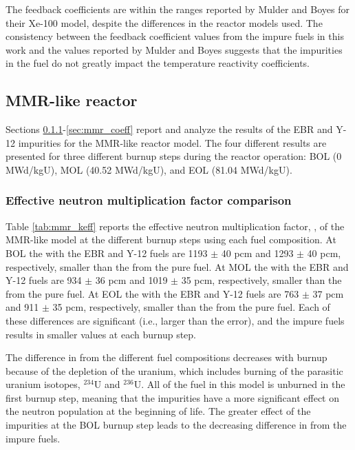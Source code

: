 The feedback coefficients are within the ranges reported 
by Mulder and Boyes \cite{mulder_neutronics_2020} for their 
Xe-100 model, despite the differences 
in the reactor models used.
The consistency between the feedback coefficient values from the impure 
fuels in this work and the values reported by Mulder and Boyes 
\cite{mulder_neutronics_2020} suggests that 
the impurities in the fuel do not greatly impact the temperature reactivity 
coefficients.

\subsection{MMR-like reactor}
Sections \ref{sec:mmr_keff}-\ref{sec:mmr_coeff} report and analyze 
the results of the 
\gls*{EBR} and Y-12 impurities for the \gls*{MMR}-like reactor model. 
The four different results are presented for three different 
burnup steps during the reactor operation: \gls*{BOL} (0 MWd/kgU),
\gls*{MOL} (40.52 MWd/kgU), and \gls*{EOL} (81.04 MWd/kgU). 

\subsubsection{Effective neutron multiplication factor comparison}\label{sec:mmr_keff}
Table \ref{tab:mmr_keff} reports the effective 
neutron multiplication factor, \keff, of the \gls*{MMR}-like 
model at the 
different burnup steps using each fuel composition. At \gls*{BOL} the 
\keff with the \gls*{EBR} and Y-12 fuels are 1193 $\pm$ 40 pcm and 
1293 $\pm$ 40 pcm, respectively, smaller than the \keff from the pure fuel. 
At \gls*{MOL} the 
\keff with the \gls*{EBR} and Y-12 fuels are 934 $\pm$ 36 pcm and 
1019 $\pm$ 35 pcm, respectively, smaller than the \keff from the pure fuel. At 
\gls*{EOL} the 
\keff with the \gls*{EBR} and Y-12 fuels are 763 $\pm$ 37 pcm and 
911 $\pm$ 35 pcm, respectively, smaller than the \keff from the pure fuel. Each 
of these differences are significant (i.e., larger than the error), and the 
impure fuels results in smaller \keff values at each 
burnup step. 

The difference in \keff 
from the different fuel compositions decreases with burnup because of 
the depletion of the uranium, which includes burning of the parasitic 
uranium isotopes, $^{234}$U and $^{236}$U. 
All of the fuel in this model is unburned in the 
first burnup step, meaning that the impurities have a more significant 
effect on the neutron population at the beginning of life. 
The greater effect of the impurities at the \gls*{BOL} burnup 
step leads to the decreasing difference in \keff from 
the impure fuels. 

